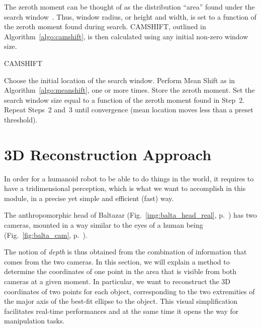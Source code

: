 The zeroth moment can be thought of as the distribution ``area'' found under the search window~\cite{bradski:1998}. Thus, window radius, or height and width, is set to a function of the zeroth moment found during search. \ac{CAMSHIFT}, outlined in Algorithm~\ref{algo:camshift}, is then calculated using any initial non-zero window size. 

\begin{algorithm}
\caption{\acs{CAMSHIFT}}
\label{algo:camshift}
\begin{algorithmic}[1]
\STATE Choose the initial location of the search window.
\STATE Perform Mean Shift as in Algorithm~\ref{algo:meanshift}, one or more times. Store the zeroth moment.
\STATE Set the search window size equal to a function of the zeroth moment found in Step~2.
\STATE Repeat Steps~2 and~3 until convergence (mean location moves less than a preset threshold). 
\end{algorithmic}
\end{algorithm}


\section{3D Reconstruction Approach}
\label{sec:3d_recon_approach}

In order for a humanoid robot to be able to do things in the world, it requires to have a tridimensional perception, which is what we want to accomplish in this module, in a precise yet simple and efficient (fast) way.

The anthropomorphic head of Baltazar (Fig.~\ref{img:balta_head_real}, p.~\pageref{img:balta_head_real}) has two cameras, mounted in a way similar to the eyes of a human being (Fig.~\ref{fig:balta_cam}, p.~\pageref{fig:balta_cam}).

The notion of \emph{depth} is thus obtained from the combination of information that comes from the two cameras. In this section, we will explain a method to determine the coordinates of one point in the area that is visible from both cameras at a given moment. In particular, we want to reconstruct the 3D coordinates of two points for each object, corresponding to the two extremities of the major axis of the best-fit ellipse to the object. This visual simplification facilitates real-time performances and at the same time it opens the way for manipulation tasks.


